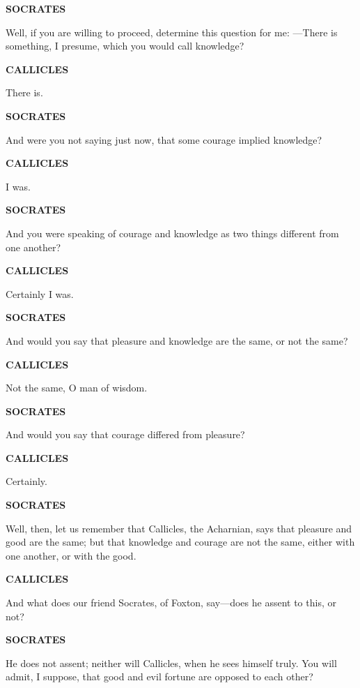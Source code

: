 \documentclass[11pt,letter]{article}
\begin{document}
\par \textbf{SOCRATES}
\par   Well, if you are willing to proceed, determine this question for me: —There is something, I presume, which you would call knowledge?

\par \textbf{CALLICLES}
\par   There is.

\par \textbf{SOCRATES}
\par   And were you not saying just now, that some courage implied knowledge?

\par \textbf{CALLICLES}
\par   I was.

\par \textbf{SOCRATES}
\par   And you were speaking of courage and knowledge as two things different from one another?

\par \textbf{CALLICLES}
\par   Certainly I was.

\par \textbf{SOCRATES}
\par   And would you say that pleasure and knowledge are the same, or not the same?

\par \textbf{CALLICLES}
\par   Not the same, O man of wisdom.

\par \textbf{SOCRATES}
\par   And would you say that courage differed from pleasure?

\par \textbf{CALLICLES}
\par   Certainly.

\par \textbf{SOCRATES}
\par   Well, then, let us remember that Callicles, the Acharnian, says that pleasure and good are the same; but that knowledge and courage are not the same, either with one another, or with the good.

\par \textbf{CALLICLES}
\par   And what does our friend Socrates, of Foxton, say—does he assent to this, or not?

\par \textbf{SOCRATES}
\par   He does not assent; neither will Callicles, when he sees himself truly. You will admit, I suppose, that good and evil fortune are opposed to each other?
\end{document}
